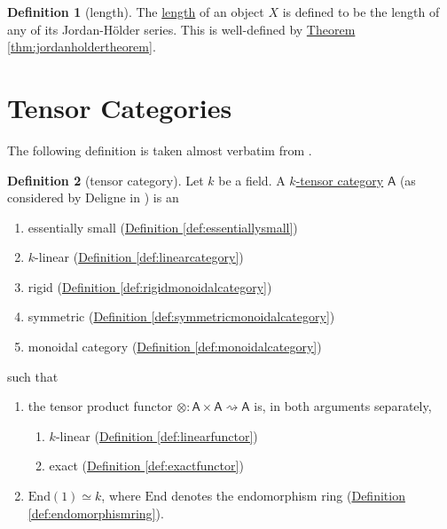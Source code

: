 \documentclass[a4paper]{report}
\newcommand{\defn}[1]{\ul{#1}}
\theoremstyle{definition}
\newtheorem{definition}{Definition}[section]
\theoremstyle{plain}
\theoremstyle{remark}
\begin{document}
\begin{definition}[length]
  \label{def:length}
  The \defn{length} of an object $X$ is defined to be the length of any of its Jordan-H{\"o}lder series. This is well-defined by \hyperref[thm:jordanholdertheorem]{Theorem \ref*{thm:jordanholdertheorem}}.
\end{definition}


\section{Tensor Categories}
The following definition is taken almost verbatim from \cite{nlab-deligne-theorem}.
\begin{definition}[tensor category]
  \label{def:tensorcategory}
  Let $k$ be a field. A \defn{$k$-tensor category} $\mathsf{A}$ (as considered by Deligne in \cite{deligne-categories-tensorielle}) is an
  \begin{enumerate}
    \item essentially small (\hyperref[def:essentiallysmall]{Definition \ref*{def:essentiallysmall}})

    \item $k$-linear (\hyperref[def:linearcategory]{Definition \ref*{def:linearcategory}})

    \item rigid (\hyperref[def:rigidmonoidalcategory]{Definition \ref*{def:rigidmonoidalcategory}})

    \item symmetric (\hyperref[def:symmetricmonoidalcategory]{Definition \ref*{def:symmetricmonoidalcategory}})

    \item monoidal category (\hyperref[def:monoidalcategory]{Definition \ref*{def:monoidalcategory}})
  \end{enumerate}
  such that 
  \begin{enumerate}
    \item the tensor product functor $\otimes\colon \mathsf{A} \times \mathsf{A} \rightsquigarrow \mathsf{A}$ is, in both arguments separately,
      \begin{enumerate}
        \item $k$-linear (\hyperref[def:linearfunctor]{Definition \ref*{def:linearfunctor}})

        \item exact (\hyperref[def:exactfunctor]{Definition \ref*{def:exactfunctor}})
      \end{enumerate}

    \item $\mathrm{End}(1) \simeq k$, where $\mathrm{End}$ denotes the endomorphism ring (\hyperref[def:endomorphismring]{Definition \ref*{def:endomorphismring}}).
  \end{enumerate}
\end{definition}
\end{document}
